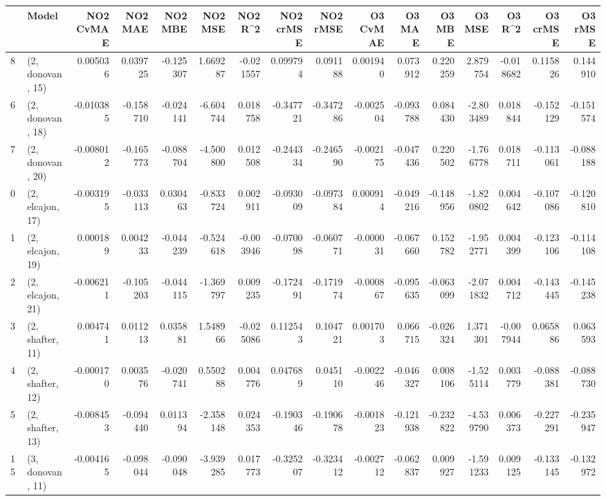 \begin{tabular}{llrrrrrrrrrrrrrr}
\toprule
{} &             Model &  NO2 CvMAE &   NO2 MAE &   NO2 MBE &    NO2 MSE &   NO2 R\textasciicircum2 &  NO2 crMSE &  NO2 rMSE &  O3 CvMAE &    O3 MAE &    O3 MBE &     O3 MSE &    O3 R\textasciicircum2 &  O3 crMSE &   O3 rMSE \\
\midrule
8  &  (2, donovan, 15) &   0.005036 &  0.039725 & -0.125307 &   1.669287 & -0.021557 &   0.099794 &  0.091188 &  0.001940 &  0.073912 &  0.220259 &   2.879754 & -0.018682 &  0.115826 &  0.144910 \\
6  &  (2, donovan, 18) &  -0.010385 & -0.158710 & -0.024141 &  -6.604744 &  0.018758 &  -0.347721 & -0.347286 & -0.002504 & -0.093788 &  0.084430 &  -2.803489 &  0.018844 & -0.152129 & -0.151574 \\
7  &  (2, donovan, 20) &  -0.008012 & -0.165773 & -0.088704 &  -4.500800 &  0.012508 &  -0.244334 & -0.246590 & -0.002175 & -0.047436 &  0.220502 &  -1.766778 &  0.018711 & -0.113061 & -0.088188 \\
0  &  (2, elcajon, 17) &  -0.003195 & -0.033113 &  0.030463 &  -0.833724 &  0.002911 &  -0.093009 & -0.097384 &  0.000914 & -0.049216 & -0.148956 &  -1.820802 &  0.004642 & -0.107086 & -0.120810 \\
1  &  (2, elcajon, 19) &   0.000189 &  0.004233 & -0.044239 &  -0.524618 & -0.003946 &  -0.070098 & -0.060771 & -0.000031 & -0.067660 &  0.152782 &  -1.952771 &  0.004399 & -0.123106 & -0.114108 \\
2  &  (2, elcajon, 21) &  -0.006211 & -0.105203 & -0.044115 &  -1.369797 &  0.009235 &  -0.172491 & -0.171974 & -0.000867 & -0.095635 & -0.063099 &  -2.071832 &  0.004712 & -0.143445 & -0.145238 \\
3  &  (2, shafter, 11) &   0.004741 &  0.011213 &  0.035881 &   1.548966 & -0.025086 &   0.112543 &  0.104721 &  0.001703 &  0.066715 & -0.026324 &   1.371301 & -0.007944 &  0.065886 &  0.063593 \\
4  &  (2, shafter, 12) &  -0.000170 &  0.003576 & -0.020741 &   0.550288 &  0.004776 &   0.047689 &  0.045110 & -0.002246 & -0.046327 &  0.008106 &  -1.525114 &  0.003779 & -0.088381 & -0.088730 \\
5  &  (2, shafter, 13) &  -0.008453 & -0.094440 &  0.011394 &  -2.358148 &  0.024353 &  -0.190346 & -0.190678 & -0.001823 & -0.121938 & -0.232822 &  -4.539790 &  0.006373 & -0.227291 & -0.235947 \\
15 &  (3, donovan, 11) &  -0.004165 & -0.098044 & -0.090048 &  -3.939285 &  0.017773 &  -0.325207 & -0.323412 & -0.002712 & -0.062837 &  0.009927 &  -1.591233 &  0.009125 & -0.133145 & -0.132972 \\

\end{tabular}
